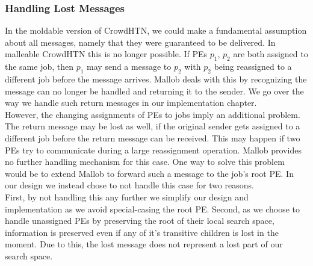 \subsubsection{Handling Lost Messages}
\label{malleable: messages}
In the moldable version of CrowdHTN, we could make a fundamental assumption about all messages, namely that they were guaranteed to be delivered. In malleable CrowdHTN this is no longer possible. If PEs $p_1$, $p_2$ are both assigned to the same job, then $p_1$ may send a message to $p_2$ with $p_2$ being reassigned to a different job before the message arrives. Mallob deals with this by recognizing the message can no longer be handled and returning it to the sender. We go over the way we handle such return messages in our implementation chapter. \\
However, the changing assignments of PEs to jobs imply an additional problem. The return message may be lost as well, if the original sender gets assigned to a different job before the return message can be received. This may happen if two PEs try to communicate during a large reassignment operation.
Mallob provides no further handling mechanism for this case. One way to solve this problem would be to extend Mallob to forward such a message to the job's root PE. In our design we instead chose to not handle this case for two reasons. \\
First, by not handling this any further we simplify our design and implementation as we avoid special-casing the root PE. Second, as we choose to handle unassigned PEs by preserving the root of their local search space, information is preserved even if any of it's transitive children is lost in the moment. Due to this, the lost message does not represent a lost part of our search space.
\begin{comment}
- this case is contrieved
- avoid turning the root into a special case
- information loss occurs specifically when a work package is lost
- we already communicate the root back
- this is no problem

- loosing information due to lost messages:
- Mallob has a mechanism to return messages
- however, messages can still be lost (return message and original sender dies in the meantime)
- we could change Mallob to send such messages to the root worker
- however, this would turn the root into a bottleneck
- again, we have mechanisms in place to deal with overall loss of information without loosing completeness
- at the same time, we need to adapt our handling of return messages to ensure all workers stay in a valid state and do not get stuck
- the worker may be replaced

- getting wrong information (worker dies, is replaced, gets message meant for old worker)

- we loose the ability to detect UNPLAN
\end{comment}
